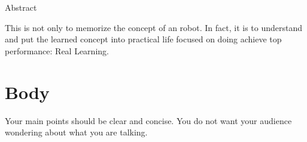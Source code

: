 \documentclass[12pt]{article}
\begin{document}

\centerline{\large Abstract} \vskip 0.3cm
This is not only to memorize the concept of an robot. In fact, it is to understand and put the learned concept into practical life focused on doing achieve top performance: Real Learning.








\section{Body}
Your main points should be clear and concise. You do not want your audience wondering about what you are talking.
\end{document}
